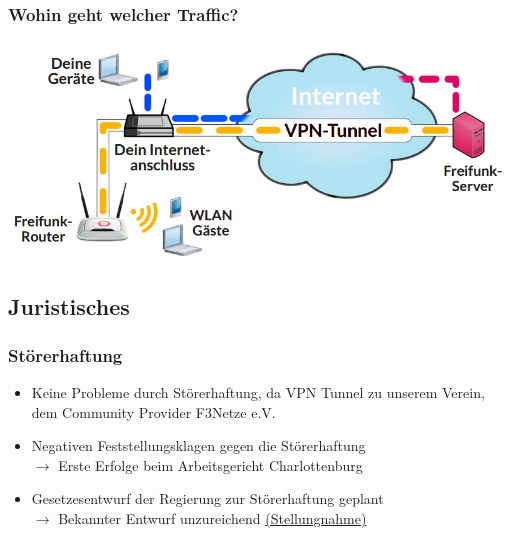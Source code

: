 \begin{frame}
\frametitle{Wohin geht welcher Traffic?}
	\includegraphics[scale=0.4]{images/personal_setup.png}
\end{frame}

\subsection{Juristisches}

\begin{frame}
\frametitle{Störerhaftung}
	\begin{itemize}
		\item Keine Probleme durch Störerhaftung, da VPN Tunnel zu unserem Verein, dem Community Provider F3Netze e.V.
		\item Negativen Feststellungsklagen gegen die Störerhaftung \\$\rightarrow$ Erste Erfolge beim Arbeitsgericht Charlottenburg
		\item Gesetzesentwurf der Regierung zur Störerhaftung geplant \\$\rightarrow$ Bekannter Entwurf unzureichend \href{http://freifunkstattangst.de/2015/03/05/tmg-gesetzesentwurf-wuerde-zu-mehr-rechtsunsicherheit-und-negativen-effekt-auf-die-verbreitung-von-funknetzwerken-fuehren/}{(Stellungnahme)}
	\end{itemize}
\end{frame}
